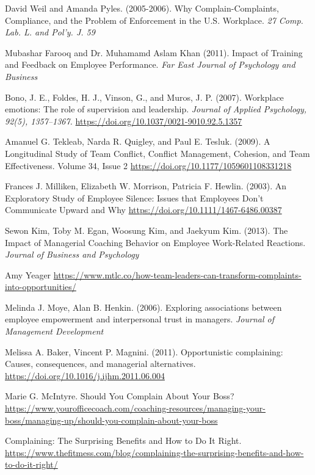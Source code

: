 \documentclass[a4paper,12pt]{article}
\begin{document}
\newpage
{}
\vspace*{-35pt}
\renewcommand{\refname}{References}
\begin{thebibliography}{99}

David Weil and Amanda Pyles. (2005-2006). Why Complain-Complaints, Compliance, and the Problem of Enforcement in the U.S. Workplace. \textit{27 Comp. Lab. L. and Pol'y. J. 59 }

Mubashar Farooq and Dr. Muhamamd Aslam Khan (2011). Impact of Training and Feedback on Employee Performance. \textit{Far East Journal of Psychology and Business }

Bono, J. E., Foldes, H. J., Vinson, G., and Muros, J. P. (2007). Workplace emotions: The role of supervision and leadership. \textit{Journal of Applied Psychology, 92(5), 1357–1367.} \url{https://doi.org/10.1037/0021-9010.92.5.1357}

Amanuel G. Tekleab, Narda R. Quigley, and Paul E. Tesluk. (2009). A Longitudinal Study of Team Conflict, Conflict Management, Cohesion, and Team Effectiveness. Volume 34, Issue 2 \url{https://doi.org/10.1177/1059601108331218}

Frances J. Milliken, Elizabeth W. Morrison, Patricia F. Hewlin. (2003). An Exploratory Study of Employee Silence: Issues that Employees Don’t Communicate Upward and Why \url{https://doi.org/10.1111/1467-6486.00387}

Sewon Kim, Toby M. Egan, Woosung Kim, and Jaekyum Kim. (2013). The Impact of Managerial Coaching Behavior on Employee Work-Related Reactions. \textit{Journal of Business and Psychology}

Amy Yeager \url{https://www.mtlc.co/how-team-leaders-can-transform-complaints-into-opportunities/}

Melinda J. Moye, Alan B. Henkin. (2006). Exploring associations between employee empowerment and interpersonal trust in managers. \textit{Journal of Management Development} 

Melissa A. Baker, Vincent P. Magnini. (2011). Opportunistic complaining: Causes, consequences, and managerial alternatives. \url{https://doi.org/10.1016/j.ijhm.2011.06.004}

Marie G. McIntyre. Should You Complain About Your Boss? \url{https://www.yourofficecoach.com/coaching-resources/managing-your-boss/managing-up/should-you-complain-about-your-boss} 

Complaining: The Surprising Benefits and How to Do It Right. \url{https://www.thefitmess.com/blog/complaining-the-surprising-benefits-and-how-to-do-it-right/}
\end{thebibliography}
\end{document}
